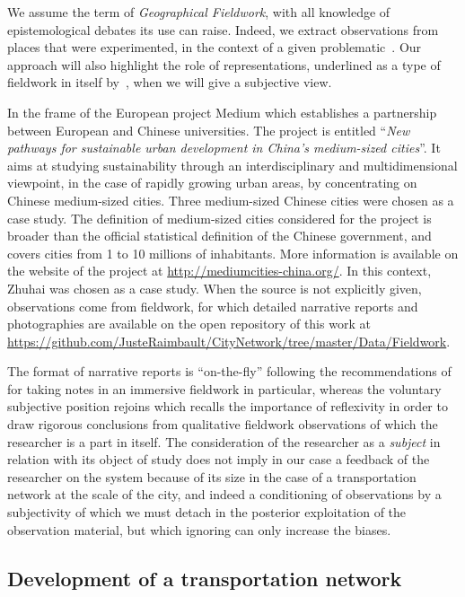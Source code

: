 We assume the term of \emph{Geographical Fieldwork}, with all knowledge of epistemological debates its use can raise. Indeed, we extract observations from places that were experimented, in the context of a given problematic~\cite{retaille2010terrain}. Our approach will also highlight the role of representations, underlined as a type of fieldwork in itself by~\cite{lefort2012terrain}, when we will give a subjective view.

In the frame of the European project Medium which establishes a partnership between European and Chinese universities. The project is entitled ``\textit{New pathways for sustainable urban development in China’s medium-sized cities}''. It aims at studying sustainability through an interdisciplinary and multidimensional viewpoint, in the case of rapidly growing urban areas, by concentrating on Chinese medium-sized cities. Three medium-sized Chinese cities were chosen as a case study. The definition of medium-sized cities considered for the project is broader than the official statistical definition of the Chinese government, and covers cities from 1 to 10 millions of inhabitants. More information is available on the website of the project at \url{http://mediumcities-china.org/}. In this context, Zhuhai was chosen as a case study. When the source is not explicitly given, observations come from fieldwork, for which detailed narrative reports and photographies are available on the open repository of this work at \url{https://github.com/JusteRaimbault/CityNetwork/tree/master/Data/Fieldwork}.

 The format of narrative reports is ``on-the-fly'' following the recommendations of \cite{goffman1989fieldwork} for taking notes in an immersive fieldwork in particular, whereas the voluntary subjective position rejoins \cite{ball1990self} which recalls the importance of reflexivity in order to draw rigorous conclusions from qualitative fieldwork observations of which the researcher is a part in itself. The consideration of the researcher as a \emph{subject} in relation with its object of study does not imply in our case a feedback of the researcher on the system because of its size in the case of a transportation network at the scale of the city, and indeed a conditioning of observations by a subjectivity of which we must detach in the posterior exploitation of the observation material, but which ignoring can only increase the biases.


\subsection{Development of a transportation network}

